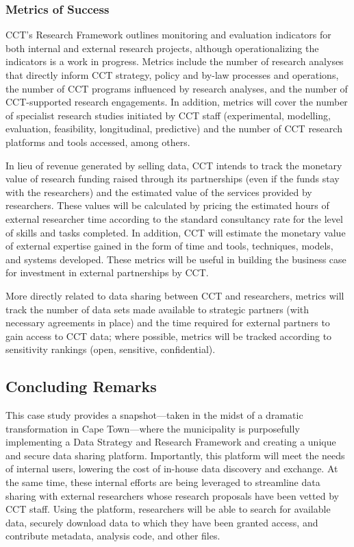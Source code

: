 \documentclass[
]{WileySix}
\begin{document}
\hypertarget{metrics-of-success-5}{%
\subsubsection{Metrics of Success}\label{metrics-of-success-5}}

CCT's Research Framework outlines monitoring and evaluation indicators for both internal and external research projects, although operationalizing the indicators is a work in progress. Metrics include the number of research analyses that directly inform CCT strategy, policy and by-law processes and operations, the number of CCT programs influenced by research analyses, and the number of CCT-supported research engagements. In addition, metrics will cover the number of specialist research studies initiated by CCT staff (experimental, modelling, evaluation, feasibility, longitudinal, predictive) and the number of CCT research platforms and tools accessed, among others.

In lieu of revenue generated by selling data, CCT intends to track the monetary value of research funding raised through its partnerships (even if the funds stay with the researchers) and the estimated value of the services provided by researchers. These values will be calculated by pricing the estimated hours of external researcher time according to the standard consultancy rate for the level of skills and tasks completed. In addition, CCT will estimate the monetary value of external expertise gained in the form of time and tools, techniques, models, and systems developed. These metrics will be useful in building the business case for investment in external partnerships by CCT.

More directly related to data sharing between CCT and researchers, metrics will track the number of data sets made available to strategic partners (with necessary agreements in place) and the time required for external partners to gain access to CCT data; where possible, metrics will be tracked according to sensitivity rankings (open, sensitive, confidential).

\hypertarget{concluding-remarks-2}{%
\subsection{Concluding Remarks}\label{concluding-remarks-2}}

This case study provides a snapshot---taken in the midst of a dramatic transformation in Cape Town---where the municipality is purposefully implementing a Data Strategy and Research Framework and creating a unique and secure data sharing platform. Importantly, this platform will meet the needs of internal users, lowering the cost of in-house data discovery and exchange. At the same time, these internal efforts are being leveraged to streamline data sharing with external researchers whose research proposals have been vetted by CCT staff. Using the platform, researchers will be able to search for available data, securely download data to which they have been granted access, and contribute metadata, analysis code, and other files.
\end{document}
